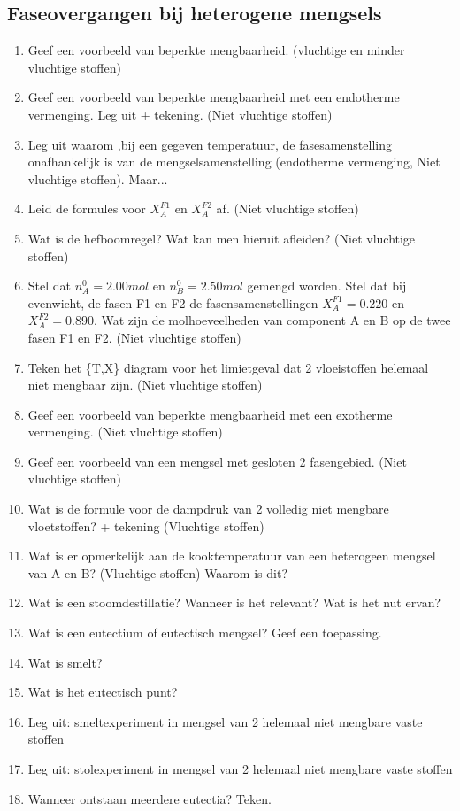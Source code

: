 \documentclass[a4paper,12pt]{article}
\begin{document}
    \subsection{Faseovergangen bij heterogene mengsels}
    \begin{enumerate}
        \item Geef een voorbeeld van beperkte mengbaarheid. (vluchtige en minder vluchtige stoffen)
        \item Geef een voorbeeld van beperkte mengbaarheid met een endotherme vermenging. Leg uit + tekening. (Niet vluchtige stoffen)
        \item Leg uit waarom ,bij een gegeven temperatuur, de fasesamenstelling onafhankelijk is van de mengselsamenstelling (endotherme vermenging, Niet vluchtige stoffen). Maar...
        \item Leid de formules voor $X_A^{F1}$ en $X_A^{F2}$ af. (Niet vluchtige stoffen)
        \item Wat is de hefboomregel? Wat kan men hieruit afleiden? (Niet vluchtige stoffen)
        \item Stel dat $n_A^0 = 2.00mol$ en $n_B^0 = 2.50mol$ gemengd worden. Stel dat bij evenwicht, de fasen F1 en F2 de fasensamenstellingen $X_A^{F1} = 0.220$ en $X_A^{F2} = 0.890$. Wat zijn de molhoeveelheden van component A en B op de twee fasen F1 en F2. (Niet vluchtige stoffen)
        \item Teken het \{T,X\} diagram voor het limietgeval dat 2 vloeistoffen helemaal niet mengbaar zijn. (Niet vluchtige stoffen)
        \item Geef een voorbeeld van beperkte mengbaarheid met een exotherme vermenging. (Niet vluchtige stoffen)
        \item Geef een voorbeeld van een mengsel met gesloten 2 fasengebied. (Niet vluchtige stoffen)
        \item Wat is de formule voor de dampdruk van 2 volledig niet mengbare vloetstoffen? + tekening (Vluchtige stoffen)
        \item Wat is er opmerkelijk aan de kooktemperatuur van een heterogeen mengsel van A en B? (Vluchtige stoffen) Waarom is dit?
        \item Wat is een stoomdestillatie? Wanneer is het relevant? Wat is het nut ervan?
        \item Wat is een eutectium of eutectisch mengsel? Geef een toepassing.
        \item Wat is smelt?
        \item Wat is het eutectisch punt?
        \item Leg uit: smeltexperiment in mengsel van 2 helemaal niet mengbare vaste stoffen
        \item Leg uit: stolexperiment in mengsel van 2 helemaal niet mengbare vaste stoffen
        \item Wanneer ontstaan meerdere eutectia? Teken.
    \end{enumerate}
\end{document}
